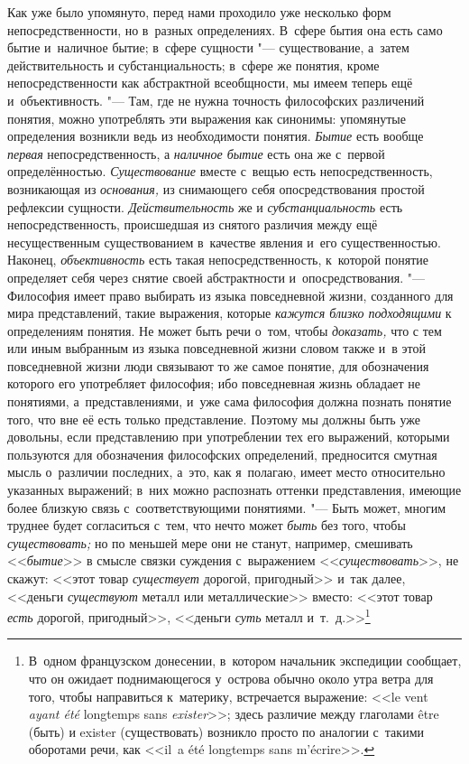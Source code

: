 Как уже было упомянуто, перед нами проходило уже несколько
форм непосредственности, но в~разных определениях. В~сфере бытия она есть
само бытие и~наличное бытие; в~сфере сущности
"--- существование, а~затем действительность и
субстанциальность; в~сфере же понятия, кроме непосредственности как
абстрактной всеобщности, мы имеем теперь ещё и~объективность. "---
Там, где не нужна точность философских различений понятия,
можно употреблять эти выражения как синонимы: упомянутые определения
возникли ведь из необходимости понятия. {\em Бытие} есть вообще
{\em первая} непосредственность, а {\em наличное бытие} есть
она же с~первой определённостью. {\em Существование}
вместе с~вещью есть непосредственность, возникающая из {\em основания,} из
снимающего себя опосредствования простой рефлексии сущности.
{\em Действительность} же и {\em субстанциальность}
есть непосредственность, происшедшая из снятого различия
между ещё несущественным существованием в~качестве явления и~его
существенностью. Наконец, {\em объективность} есть
такая непосредственность, к~которой понятие определяет себя через снятие
своей абстрактности и~опосредствования. "--- Философия имеет
право выбирать из языка повседневной жизни, созданного для мира
представлений, такие выражения, которые {\em кажутся близко подходящими}
к определениям понятия. Не может быть речи о~том, чтобы {\em доказать,} что
с тем или иным выбранным из языка повседневной жизни словом также и~в этой
повседневной жизни люди связывают то же самое понятие, для обозначения
которого его употребляет философия; ибо повседневная жизнь
обладает не понятиями, а~представлениями, и~уже сама философия должна
познать понятие того, что вне её есть только представление. Поэтому мы
должны быть уже довольны, если представлению при употреблении тех его
выражений, которыми пользуются для обозначения философских определений,
предносится смутная мысль о~различии последних, а~это, как я~полагаю, имеет
место относительно указанных выражений; в~них можно распознать оттенки
представления, имеющие более близкую связь с~соответствующими понятиями. "---
Быть может, многим труднее будет согласиться с~тем, что нечто
может {\em быть} без того, чтобы {\em существовать;}
но по меньшей мере они не станут, например, смешивать <<{\em бытие}>>
в смысле связки суждения с~выражением <<{\em существовать}>>, не
скажут: <<этот товар {\em существует}
дорогой, пригодный>> и~так далее, <<деньги {\em существуют} металл
или металлические>> вместо: <<этот товар {\em есть} дорогой,
пригодный>>, <<деньги {\em суть} металл и~т.~д.>>\footnote{В~одном
французском донесении, в~котором начальник экспедиции
сообщает, что он ожидает поднимающегося у~острова обычно около утра ветра
для того, чтобы направиться к~материку, встречается выражение: <<le vent
{\em ayant été} longtemps sans
{\em exister}>>\label{bkm:bm64};
здесь различие между глаголами être (быть) и
exister (существовать) возникло просто по аналогии с~такими
оборотами речи, как <<il~a été longtemps sans
m'écrire>>.}
